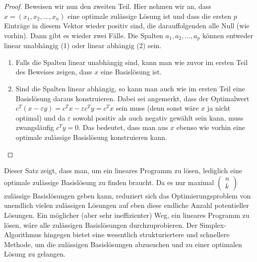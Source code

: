 \documentclass{article}
\begin{document}
\begin{proof}
    Beweisen wir nun den zweiten Teil. Hier nehmen wir an, dass \(x=(x_1,x_2,...,x_n)\) eine optimale zulässige Lösung ist und dass die ersten \(p\) Einträge in diesem Vektor wieder positiv sind, die darauffolgenden alle Null (wie vorhin). Dann gibt es wieder zwei Fälle. Die Spalten \(a_1, a_2,...,a_p\) können entweder linear unabhängig (1) oder linear abhängig (2) sein.
    \begin{enumerate}
        \item Falls die Spalten linear unabhängig sind, kann man wie zuvor im ersten Teil des Beweises zeigen, dass \(x\) eine Basislösung ist.
        \item Sind die Spalten linear abhängig, so kann man auch wie im ersten Teil eine Basislösung daraus konstruieren. Dabei sei angemerkt, dass der Optimalwert \(c^T(x-\varepsilon y)=c^Tx-\varepsilon c^Ty=c^Tx\) sein muss (denn sonst wäre \(x\) ja nicht optimal) und da \(\varepsilon\) sowohl positiv als auch negativ gewählt sein kann, muss zwangsläufig \(c^Ty=0\). Das bedeutet, dass man aus \(x\) ebenso wie vorhin eine optimale zulässige Basislösung konstruieren kann.
    \end{enumerate}
\end{proof}
Dieser Satz zeigt, dass man, um ein lineares Programm zu lösen, lediglich eine optimale zulässige Basislösung zu finden braucht. Da es nur maximal \(
\begin{pmatrix}
    n\\k
\end{pmatrix}
\) zulässige Basislösungen geben kann, reduziert sich das Optimierungsproblem von unendlich vielen zulässigen Lösungen auf eben diese endliche Anzahl potentieller Lösungen. Ein möglicher (aber sehr ineffizienter) Weg, ein lineares Programm zu lösen, wäre alle zulässigen Basislösungen durchzuprobieren. Der Simplex-Algorithmus hingegen bietet eine wesentlich strukturiertere und schnellere Methode, um die zulässigen Basislösungen abzusuchen und zu einer optimalen Lösung zu gelangen.
\end{document}
